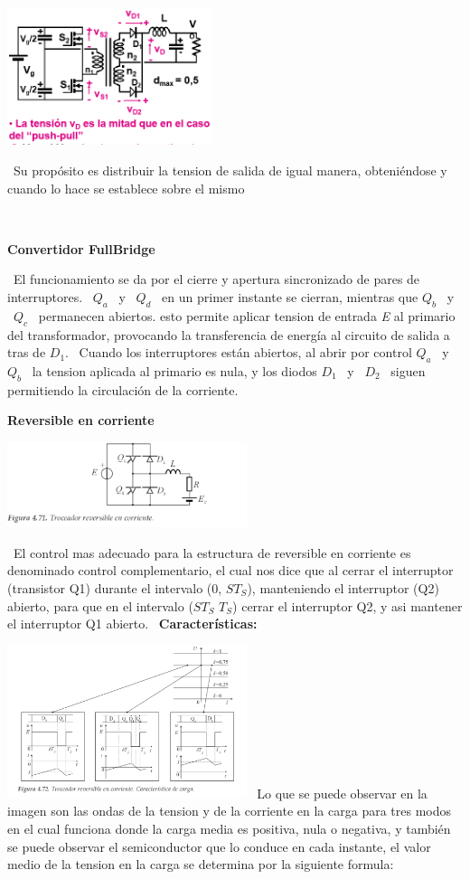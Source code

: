 \documentclass[12pt,letterpaper]{article}
\begin{document}
\

\includegraphics[width=6cm]{Halfbridge.png} 
\

\
Su propósito es distribuir la tension de salida de igual manera, obteniéndose y cuando lo hace se establece sobre el mismo 

\
\

\textbf{Convertidor FullBridge}
\

\
El funcionamiento se da por el cierre y apertura sincronizado de pares de interruptores.
\
$Q_a$ \ y \ $Q_d$ \ en un primer instante se cierran, mientras que $Q_b$ \ y \ $Q_c$ \ permanecen abiertos. esto permite aplicar tension de entrada \textit{E} al primario del transformador, provocando la transferencia de energía al circuito de salida a tras de $D_1$.
\
Cuando los interruptores están abiertos, al abrir por control $Q_a$ \ y \ $Q_b$ \ la tension aplicada al primario es nula, y los diodos $D_1$ \ y  \ $D_2$ \ siguen permitiendo la circulación de la corriente.


\textbf{Reversible en corriente}
\
\


\includegraphics[width=7cm]{Reversible en corriente.png} 

\
El control mas adecuado para la estructura de reversible  en corriente  es denominado control complementario, el cual nos dice que al cerrar el interruptor (transistor Q1) durante el intervalo (0, $ST_S$), manteniendo el interruptor (Q2) abierto, para que en el intervalo ($ST_S$  $T_S$) cerrar el interruptor Q2, y asi mantener el interruptor Q1 abierto.
\
\textbf{Características:}


\includegraphics[width=7cm]{Caracteristicas de carga, Reversible en corriente.png} 
\
Lo que se puede observar en la imagen son las ondas de la tension y de la corriente en la carga para tres modos en el cual funciona donde la carga media es positiva, nula o negativa, y también se puede observar el semiconductor que lo conduce en cada instante, el valor medio de la tension en la carga se determina por la siguiente formula:
\end{document}
